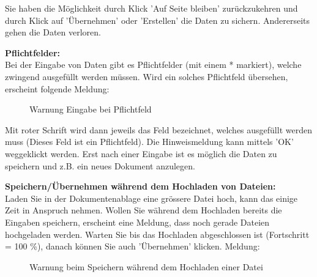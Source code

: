 \vspace{\baselineskip}

Sie haben die Möglichkeit durch Klick 'Auf Seite bleiben' zurückzukehren und durch Klick auf 'Übernehmen' oder 'Erstellen' die Daten zu sichern. Andererseits gehen die Daten verloren.

\vspace{\baselineskip}

\textbf{Pflichtfelder:}\\
Bei der Eingabe von Daten gibt es Pflichtfelder (mit einem * markiert), welche zwingend ausgefüllt werden müssen. Wird ein solches Pflichtfeld übersehen, erscheint folgende Meldung:

\begin{figure}[H]
\caption{Warnung Eingabe bei Pflichtfeld}
\end{figure}

Mit roter Schrift wird dann jeweils das Feld bezeichnet, welches ausgefüllt werden muss (Dieses Feld ist ein Pflichtfeld). Die Hinweismeldung kann mittels 'OK' weggeklickt werden. Erst nach einer Eingabe ist es möglich die Daten zu speichern und z.B. ein neues Dokument anzulegen. 

\vspace{\baselineskip}

\textbf{Speichern/Übernehmen während dem Hochladen von Dateien:}\\
Laden Sie in der Dokumentenablage eine grössere Datei hoch, kann das einige Zeit in Anspruch nehmen. Wollen Sie während dem Hochladen bereits die Eingaben speichern, erscheint eine Meldung, dass noch gerade Dateien hochgeladen werden. Warten Sie bis das Hochladen abgeschlossen ist (Fortschritt = 100 \%), danach können Sie auch 'Übernehmen' klicken. Meldung:

\begin{figure}[H]
\caption{Warnung beim Speichern während dem Hochladen einer Datei}
\end{figure}

\pagebreak
